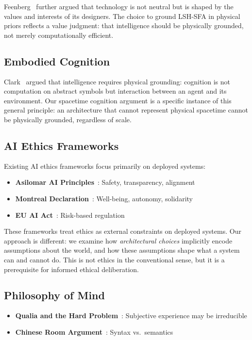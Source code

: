\documentclass{article}
\begin{document}
Feenberg~\citep{feenberg1999} further argued that technology is not neutral but is shaped by the values and interests of its designers. The choice to ground LSH-SFA in physical priors reflects a value judgment: that intelligence should be physically grounded, not merely computationally efficient.

\subsection{Embodied Cognition}

Clark~\citep{clark1997} argued that intelligence requires physical grounding: cognition is not computation on abstract symbols but interaction between an agent and its environment. Our spacetime cognition argument is a specific instance of this general principle: an architecture that cannot represent physical spacetime cannot be physically grounded, regardless of scale.

\subsection{AI Ethics Frameworks}

Existing AI ethics frameworks focus primarily on deployed systems:

\begin{itemize}
\item \textbf{Asilomar AI Principles}~\citep{asilomar2017}: Safety, transparency, alignment
\item \textbf{Montreal Declaration}~\citep{montreal2018}: Well-being, autonomy, solidarity
\item \textbf{EU AI Act}~\citep{euai2021}: Risk-based regulation
\end{itemize}

These frameworks treat ethics as external constraints on deployed systems. Our approach is different: we examine how \textit{architectural choices} implicitly encode assumptions about the world, and how these assumptions shape what a system can and cannot do. This is not ethics in the conventional sense, but it is a prerequisite for informed ethical deliberation.

\subsection{Philosophy of Mind}

\begin{itemize}
\item \textbf{Qualia and the Hard Problem}~\citep{chalmers1996}: Subjective experience may be irreducible
\item \textbf{Chinese Room Argument}~\citep{searle1980}: Syntax vs.\ semantics
\end{itemize}
\end{document}
